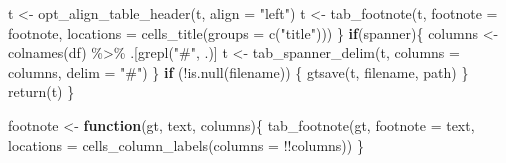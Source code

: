 \documentclass[
]{article}
\newenvironment{Shaded}{\begin{snugshade}}{\end{snugshade}}
\newcommand{\AttributeTok}[1]{\textcolor[rgb]{0.77,0.63,0.00}{#1}}
\newcommand{\ControlFlowTok}[1]{\textcolor[rgb]{0.13,0.29,0.53}{\textbf{#1}}}
\newcommand{\FunctionTok}[1]{\textcolor[rgb]{0.00,0.00,0.00}{#1}}
\newcommand{\NormalTok}[1]{#1}
\newcommand{\OtherTok}[1]{\textcolor[rgb]{0.56,0.35,0.01}{#1}}
\newcommand{\SpecialCharTok}[1]{\textcolor[rgb]{0.00,0.00,0.00}{#1}}
\newcommand{\StringTok}[1]{\textcolor[rgb]{0.31,0.60,0.02}{#1}}
\begin{document}
\begin{Shaded}
\begin{Highlighting}[]
\NormalTok{      t }\OtherTok{\textless{}{-}} \FunctionTok{opt\_align\_table\_header}\NormalTok{(t, }\AttributeTok{align =} \StringTok{"left"}\NormalTok{)}
\NormalTok{      t }\OtherTok{\textless{}{-}} \FunctionTok{tab\_footnote}\NormalTok{(t, }\AttributeTok{footnote =}\NormalTok{ footnote,}
        \AttributeTok{locations =} \FunctionTok{cells\_title}\NormalTok{(}\AttributeTok{groups =} \FunctionTok{c}\NormalTok{(}\StringTok{"title"}\NormalTok{)))}
\NormalTok{    \}}
    \ControlFlowTok{if}\NormalTok{(spanner)\{}
\NormalTok{      columns }\OtherTok{\textless{}{-}} \FunctionTok{colnames}\NormalTok{(df) }\SpecialCharTok{\%\textgreater{}\%} 
\NormalTok{        .[}\FunctionTok{grepl}\NormalTok{(}\StringTok{"\#"}\NormalTok{, .)]}
\NormalTok{      t }\OtherTok{\textless{}{-}} \FunctionTok{tab\_spanner\_delim}\NormalTok{(t, }\AttributeTok{columns =}\NormalTok{ columns,}
        \AttributeTok{delim =} \StringTok{"\#"}\NormalTok{)}
\NormalTok{    \}}
    \ControlFlowTok{if}\NormalTok{ (}\SpecialCharTok{!}\FunctionTok{is.null}\NormalTok{(filename)) \{}
      \FunctionTok{gtsave}\NormalTok{(t, filename, path)}
\NormalTok{    \}}
    \FunctionTok{return}\NormalTok{(t)}
\NormalTok{  \}}

\NormalTok{footnote }\OtherTok{\textless{}{-}} \ControlFlowTok{function}\NormalTok{(gt, text, columns)\{}
  \FunctionTok{tab\_footnote}\NormalTok{(gt, }\AttributeTok{footnote =}\NormalTok{ text,}
    \AttributeTok{locations =} \FunctionTok{cells\_column\_labels}\NormalTok{(}\AttributeTok{columns =} \SpecialCharTok{!!}\NormalTok{columns))}
\NormalTok{\}}


\end{Highlighting}
\end{Shaded}
\end{document}
